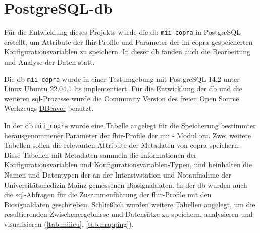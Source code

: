 \section{PostgreSQL-\acs{db}} \label{sec:database}

Für die Entwicklung dieses Projekts wurde die \ac{db} \texttt{mii\_copra} in PostgreSQL erstellt, um Attribute der \ac{fhir}-Profile und Parameter der im \ac{copra} gespeicherten Konfigurationsvariablen zu speichern. In dieser \ac{db} fanden auch die Bearbeitung und Analyse der Daten statt.

Die \ac{db} \texttt{mii\_copra} wurde in einer Testumgebung mit PostgreSQL 14.2 unter Linux Ubuntu 22.04.1 \ac{lts} implementiert. Für die Entwicklung der \ac{db} und die weiteren \ac{sql}-Prozesse wurde die Community Version des freien Open Source Werkzeugs \href{https://dbeaver.io/}{DBeaver} benutzt.

In der \ac{db} \texttt{mii\_copra} wurde eine Tabelle angelegt für die Speicherung bestimmter herausgenommener Parameter der \ac{fhir}-Profile der \ac{mii} - Modul \glqq\ac{icu}\grqq{}. Zwei weitere Tabellen sollen die relevanten Attribute der Metadaten von \ac{copra} speichern. Diese Tabellen mit Metadaten 
sammeln die Informationen der Konfigurationsvariablen und Konfigurationsvariablen-Typen, und beinhalten die Namen und Datentypen der an der Intensivstation und Notaufnahme der Universitätsmedizin Mainz gemessenen Biosignaldaten. In der \ac{db} wurden auch die \ac{sql}-Abfragen für die Zusammenführung der \ac{fhir}-Profile mit den Biosignaldaten geschrieben. Schließlich wurden weitere Tabellen angelegt, um die resultierenden Zwischenergebnisse und Datensätze zu speichern, analysieren und visualisieren (\ref{tab:miiicu}, \ref{tab:mapping}).